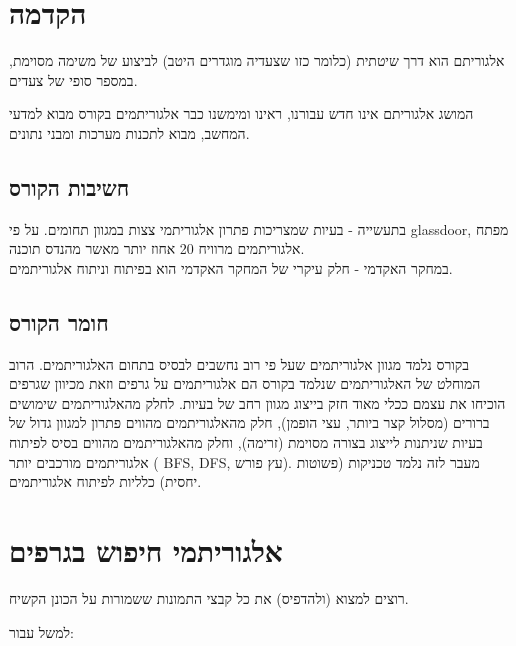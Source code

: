 \section*{הקדמה}
\begin{displayquote}
אלגוריתם הוא דרך שיטתית (כלומר כזו שצעדיה מוגדרים היטב) לביצוע של משימה מסוימת, 
במספר סופי של צעדים.
\end{displayquote}
המושג אלגוריתם אינו חדש עבורנו, ראינו ומימשנו כבר אלגוריתמים בקורס מבוא למדעי המחשב, 
מבוא לתכנות מערכות ומבני נתונים.
\subsection*{חשיבות הקורס}
בתעשייה - בעיות שמצריכות פתרון אלגוריתמי צצות במגוון תחומים. על פי
\textenglish{glassdoor}, 
מפתח אלגוריתמים מרוויח 20 אחוז יותר מאשר מהנדס תוכנה.
\\
במחקר האקדמי - חלק עיקרי של המחקר האקדמי הוא בפיתוח וניתוח אלגוריתמים.
\subsection*{חומר הקורס}
בקורס נלמד מגוון אלגוריתמים שעל פי רוב נחשבים לבסיס בתחום האלגוריתמים.
הרוב המוחלט של האלגוריתמים שנלמד בקורס הם אלגוריתמים על גרפים 
וזאת מכיוון שגרפים הוכיחו את עצמם ככלי מאוד חזק בייצוג מגוון רחב של בעיות.
לחלק מהאלגוריתמים שימושים ברורים (מסלול קצר ביותר, עצי הופמן), 
חלק מהאלגוריתמים מהווים פתרון למגוון גדול של בעיות שניתנות לייצוג בצורה מסוימת (זרימה), 
וחלק מהאלגוריתמים מהווים בסיס לפיתוח אלגוריתמים מורכבים יותר (%
\textenglish{BFS},
\textenglish{DFS}, 
עץ פורש).
מעבר לזה נלמד טכניקות (פשוטות יחסית) כלליות לפיתוח אלגוריתמים.
\section*{אלגוריתמי חיפוש בגרפים}
\begin{example}
רוצים למצוא (ולהדפיס) את כל קבצי התמונות ששמורות על הכונן הקשיח.
\end{example}
למשל עבור:
\begin{center}
\end{center}

